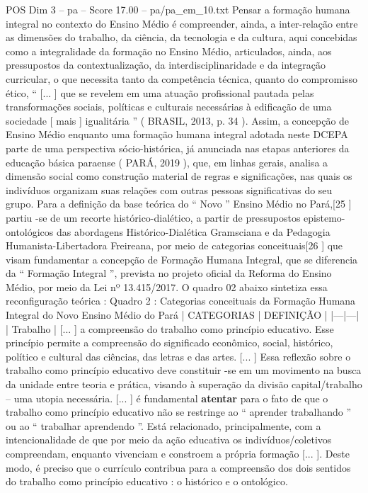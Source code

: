 \begin{textsample}{POS Dim 3 – pa – Score 17.00 – pa/pa\_em\_10.txt}
Pensar a formação humana integral no contexto do Ensino Médio é compreender, ainda, a inter-relação entre as dimensões do trabalho, da ciência, da tecnologia e da cultura, aqui concebidas como a integralidade da formação no Ensino Médio, articulados, ainda, aos pressupostos da contextualização, da interdisciplinaridade e da integração curricular, o que necessita tanto da competência técnica, quanto do compromisso ético, “ [... ] que se revelem em uma atuação profissional pautada pelas transformações sociais, políticas e culturais necessárias à edificação de uma sociedade [ mais ] igualitária ” ( BRASIL, 2013, p. 34 ).
Assim, a concepção de Ensino Médio enquanto uma formação humana integral adotada neste DCEPA parte de uma perspectiva sócio-histórica, já anunciada nas etapas anteriores da educação básica paraense ( PARÁ, 2019 ), que, em linhas gerais, analisa a dimensão social como construção material de regras e significações, nas quais os indivíduos organizam suas relações com outras pessoas significativas do seu grupo.
Para a definição da base teórica do “ Novo ” Ensino Médio no Pará,[25 ] partiu -se de um recorte histórico-dialético, a partir de pressupostos epistemo-ontológicos das abordagens Histórico-Dialética Gramsciana e da Pedagogia Humanista-Libertadora Freireana, por meio de categorias conceituais[26 ] que visam fundamentar a concepção de Formação Humana Integral, que se diferencia da “ Formação Integral ”, prevista no projeto oficial da Reforma do Ensino Médio, por meio da Lei nº 13.415/2017.
O quadro 02 abaixo sintetiza essa reconfiguração teórica : Quadro 2 : Categorias conceituais da Formação Humana Integral do Novo Ensino Médio do Pará | CATEGORIAS | DEFINIÇÃO | |---|---| | Trabalho | [... ] a compreensão do trabalho como princípio educativo.
Esse princípio permite a compreensão do significado econômico, social, histórico, político e cultural das ciências, das letras e das artes. [... ] Essa reflexão sobre o trabalho como princípio educativo deve constituir -se em um movimento na busca da unidade entre teoria e prática, visando à superação da divisão capital/trabalho – uma utopia necessária. [... ] é fundamental \textbf{atentar} para o fato de que o trabalho como princípio educativo não se restringe ao “ aprender trabalhando ” ou ao “ trabalhar aprendendo ”.
Está relacionado, principalmente, com a intencionalidade de que por meio da ação educativa os indivíduos/coletivos compreendam, enquanto vivenciam e constroem a própria formação [... ].
Deste modo, é preciso que o currículo contribua para a compreensão dos dois sentidos do trabalho como princípio educativo : o histórico e o ontológico.

\end{textsample}
